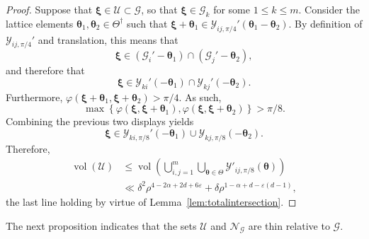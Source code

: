 \documentclass[10pt]{amsart}
\theoremstyle{definition}\newtheorem{defi}[theo]{Definition}\newtheorem{rema}[theo]{Remark}\newtheorem{exam}[theo]{Example}\newtheorem{nota}[theo]{Notation}
\DeclareMathOperator{\vol}{vol}
\newcommand{\CG}{\mathcal{G}}
\newcommand{\CN}{\mathcal{N}}
\newcommand{\CU}{\mathcal{U}}
\newcommand{\CY}{\mathcal{Y}}
\newcommand{\btheta}{\boldsymbol \theta}
\newcommand{\bxi}{\boldsymbol \xi}
\renewcommand{\phi}{\varphi}
\newcommand{\eps}{\varepsilon}
\newcommand{\set}[1]{\left\{ #1 \right\}}
\begin{document}
\begin{proof}
Suppose that $\bxi \in \CU \subset \CG$, so that $\bxi \in \CG_k$ for some $1 \le k \le m$. Consider the lattice elements $\btheta_1, \btheta_2 \in
\Theta^\dagger$ such that $\bxi + \btheta_1 \in \CY_{ij,\pi/4}'(\btheta_1 -
\btheta_2)$. By definition of $\CY_{ij,\pi/4}'$ and translation, this means that
\begin{equation}
\bxi \in (\CG_i' - \btheta_1) \cap (\CG_j' - \btheta_2),
\end{equation}
and therefore that
\begin{equation}
\bxi \in \CY_{ki}'(-\btheta_1) \cap \CY_{kj}'(- \btheta_2).
\end{equation}
Furthermore, $\phi(\bxi+\btheta_1,\bxi+\btheta_2) > \pi/4$. As such,
\begin{equation}
\max \set{\phi(\bxi,\bxi+\btheta_1),\phi(\bxi,\bxi+\btheta_2)} > \pi/8.
\end{equation}
Combining the previous two displays yields
\begin{equation}
\bxi \in \CY_{ki,\pi/8}'(-\btheta_1) \cup \CY_{kj,\pi/8}(-\btheta_2).
\end{equation}
Therefore,
\begin{equation}
\begin{aligned}
\vol(\CU) &\le \vol\left(\bigcup_{i,j = 1}^m \bigcup_{\btheta \in
\Theta} \CY'_{ij,\pi/8}(\btheta) \right) \\
&\ll \delta^2 \rho^{4 - 2 \alpha + 2d + 6\eps} + \delta \rho^{1 -
\alpha + d - \eps(d - 1)},
\end{aligned}
\end{equation}
the last line holding by virtue of Lemma~\ref{lem:totalintersection}.
\end{proof}

The next proposition indicates that the sets $\CU$ and $\CN_\CG$ are thin relative to $\CG$.
\end{document}
